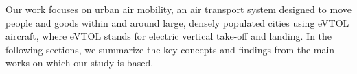 \documentclass[../../thesis.tex]{subfiles}
\begin{document}
Our work focuses on urban air mobility, an air transport system designed to move people and goods within and around large, densely populated cities using eVTOL aircraft, where eVTOL stands for electric vertical take-off and landing. 
In the following sections, we summarize the key concepts and findings from the main works on which our study is based.  
\end{document}
